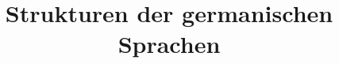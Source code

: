 





\newtoggle{klimaheading}\toggletrue{klimaheading}


\title{Strukturen der germanischen Sprachen}




%
%
%
%
%
%
%
%
%
%
%

 
\hypersetup{bookmarksopen=false}

\huberlintitlepage








%












